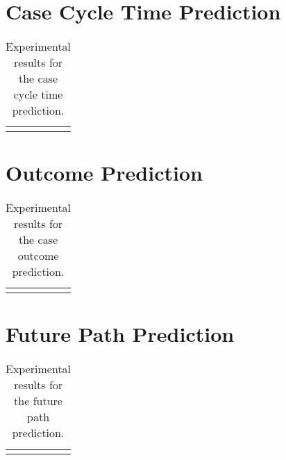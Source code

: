 \section{Case Cycle Time Prediction}

\begin{table}[!htbp]
	\begin{tabularx}{\textwidth}{l l l l }
		\toprule
		& & &  \\
		\midrule
		& & & \\
		\bottomrule
	\end{tabularx}
	\caption[Experimental results for the case cycle time prediction]{Experimental results for the case cycle time prediction.}
	\label{tab:case-cycle-time}
\end{table}

\section{Outcome Prediction}

\begin{table}[!htbp]
	\begin{tabularx}{\textwidth}{l l l l }
		\toprule
		& & &  \\
		\midrule
		& & & \\
		\bottomrule
	\end{tabularx}
	\caption[Experimental results for the case outcome prediction]{Experimental results for the case outcome prediction.}
	\label{tab:outcome}
\end{table}

\section{Future Path Prediction}

\begin{table}[!htbp]
	\begin{tabularx}{\textwidth}{l l l l }
		\toprule
		& & &  \\
		\midrule
		& & & \\
		\bottomrule
	\end{tabularx}
	\caption[Experimental results for the future path prediction]{Experimental results for the future path prediction.}
	\label{tab:future-path}
\end{table}